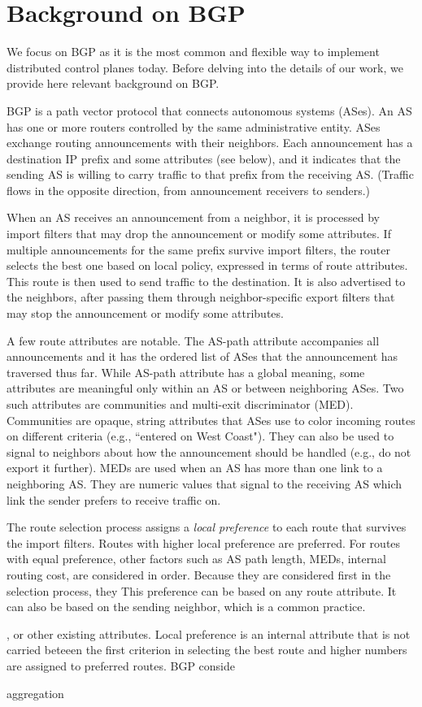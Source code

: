 \section{Background on BGP}
\label{sec:background}

We focus on BGP as it is the most common and flexible way to implement distributed control planes today. Before delving into the details of our work, we provide here relevant background on BGP.

BGP is a path vector protocol that connects autonomous systems (ASes). An AS has one or more routers controlled by the same administrative entity. ASes exchange routing announcements with their neighbors. Each announcement has a destination IP prefix and some attributes (see below), and it indicates that the sending AS is willing to carry traffic to that prefix from the receiving AS. (Traffic flows in the opposite direction, from announcement receivers to senders.)

When an AS receives an announcement from a neighbor, it is processed by import filters that may drop the announcement or modify some attributes. If multiple announcements for the same prefix survive import filters, the router selects the best one based on local policy, expressed in terms of route attributes. This route is then used to send traffic to the destination. It is also advertised to the neighbors, after passing them through neighbor-specific export filters that may stop the announcement or modify some attributes.

A few route attributes are notable. The AS-path attribute accompanies all announcements and it has the ordered list of ASes that the announcement has traversed thus far. While AS-path attribute has a global meaning, some attributes are meaningful only within an AS or between neighboring ASes.  Two such attributes are communities and multi-exit discriminator (MED). Communities are opaque, string attributes that ASes use to color incoming routes on different criteria (e.g., ``entered on West Coast"). They can also be used to signal to neighbors about how the announcement should be handled (e.g., do not export it further). MEDs are used when an AS has more than one link to a neighboring AS. They are numeric values that signal to the receiving AS which link the sender prefers to receive traffic on. 

The route selection process assigns a {\em local preference} to each route that survives the import filters. Routes with higher local preference are preferred. For routes with equal preference, other factors such as AS path length, MEDs, internal routing cost, are considered in order. Because they are considered first in the selection process, they This preference can be based on any route attribute. It can also be based on the sending neighbor, which is a common practice.
 
 , or other existing attributes.  Local preference is an internal attribute that is not carried beteeen the first criterion in selecting the best route and higher numbers are assigned to preferred routes. BGP conside

aggregation



